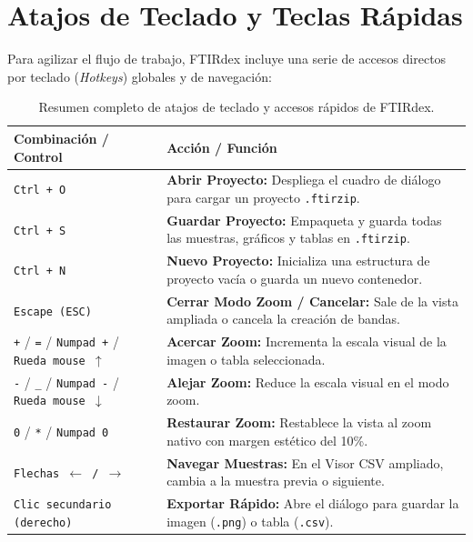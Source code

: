 \documentclass[11pt,a4paper]{article}
\begin{document}
\section{Atajos de Teclado y Teclas Rápidas}

Para agilizar el flujo de trabajo, FTIRdex incluye una serie de accesos directos por teclado (\textit{Hotkeys}) globales y de navegación:

\begin{table}[h!]
\centering
\begin{tabularx}{\textwidth}{@{}l X@{}}
\toprule
\textbf{Combinación / Control} & \textbf{Acción / Función} \\ \midrule
\texttt{Ctrl + O} & \textbf{Abrir Proyecto:} Despliega el cuadro de diálogo para cargar un proyecto \texttt{.ftirzip}. \\ \hline
\texttt{Ctrl + S} & \textbf{Guardar Proyecto:} Empaqueta y guarda todas las muestras, gráficos y tablas en \texttt{.ftirzip}. \\ \hline
\texttt{Ctrl + N} & \textbf{Nuevo Proyecto:} Inicializa una estructura de proyecto vacía o guarda un nuevo contenedor. \\ \hline
\texttt{Escape (ESC)} & \textbf{Cerrar Modo Zoom / Cancelar:} Sale de la vista ampliada o cancela la creación de bandas. \\ \hline
\texttt{+} / \texttt{=} / \texttt{Numpad +} / \texttt{Rueda mouse $\uparrow$} & \textbf{Acercar Zoom:} Incrementa la escala visual de la imagen o tabla seleccionada. \\ \hline
\texttt{-} / \texttt{\_} / \texttt{Numpad -} / \texttt{Rueda mouse $\downarrow$} & \textbf{Alejar Zoom:} Reduce la escala visual en el modo zoom. \\ \hline
\texttt{0} / \texttt{*} / \texttt{Numpad 0} & \textbf{Restaurar Zoom:} Restablece la vista al zoom nativo con margen estético del 10\%. \\ \hline
\texttt{Flechas $\leftarrow$ / $\rightarrow$} & \textbf{Navegar Muestras:} En el Visor CSV ampliado, cambia a la muestra previa o siguiente. \\ \hline
\texttt{Clic secundario (derecho)} & \textbf{Exportar Rápido:} Abre el diálogo para guardar la imagen (\texttt{.png}) o tabla (\texttt{.csv}). \\ \bottomrule
\end{tabularx}
\caption{Resumen completo de atajos de teclado y accesos rápidos de FTIRdex.}
\end{table}
\end{document}
